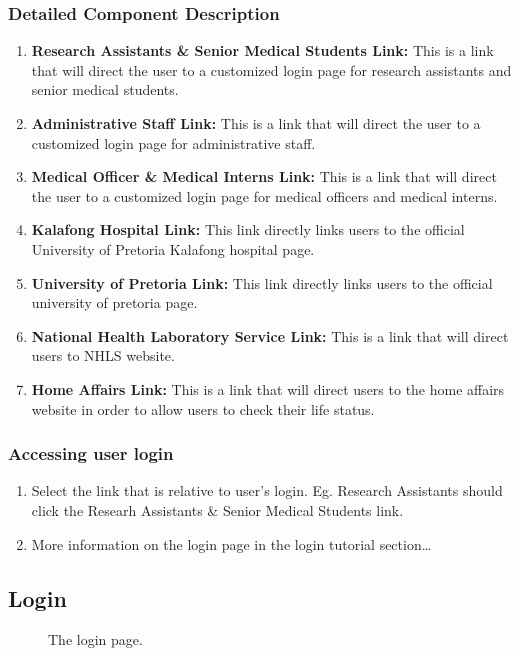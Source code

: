 \documentclass[14pt, a4paper]{article}
\begin{document}
	\subsubsection{Detailed Component Description}
		\begin{enumerate}
			\item \textbf{Research Assistants \& Senior Medical Students Link:} This is a link that will direct the user to a customized login page for research assistants and senior medical students.
			\item \textbf{Administrative Staff Link:} This is a link that will direct the user to a customized login page for administrative staff.
			\item \textbf{Medical Officer \& Medical Interns Link:} This is a link that will direct the user to a customized login page for medical officers and medical interns.
			\item \textbf{Kalafong Hospital Link:} This link directly links users to the official University of Pretoria Kalafong hospital page.
			\item \textbf{University of Pretoria Link: } This link directly links users to the official university of pretoria page.
			\item \textbf{National Health Laboratory Service Link:} This is a link that will direct users to NHLS website.
			\item \textbf{Home Affairs Link:} This is a link that will direct users to the home affairs website in order to allow users to check their life status.
		\end{enumerate}
	\subsubsection{Accessing user login}
		\begin{enumerate}
			\item Select the link that is relative to user's login. Eg. Research Assistants should click the Researh Assistants \& Senior Medical Students link.
			\item More information on the login page in the login tutorial section\ldots
		\end{enumerate}
\subsection{Login}
	\begin{figure}[H]
		\caption{The login page.}
  		\label{fig:login1}
	\end{figure}
\end{document}
